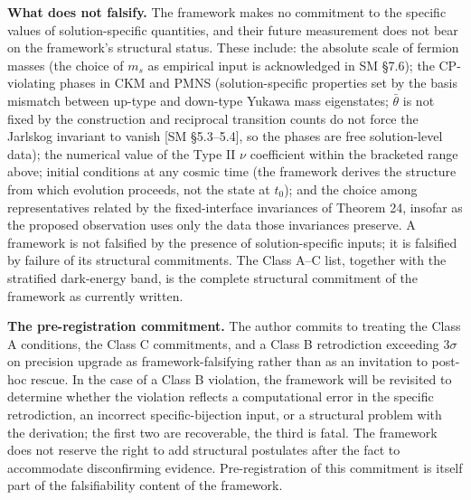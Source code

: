 \documentclass[
]{article}
\begin{document}
\textbf{What does not falsify.} The framework makes no commitment to the
specific values of solution-specific quantities, and their future
measurement does not bear on the framework's structural status. These
include: the absolute scale of fermion masses (the choice of \(m_s\) as
empirical input is acknowledged in SM §7.6); the CP-violating phases in
CKM and PMNS (solution-specific properties set by the basis mismatch
between up-type and down-type Yukawa mass eigenstates; \(\bar\theta\) is
not fixed by the construction and reciprocal transition counts do not
force the Jarlskog invariant to vanish {[}SM §5.3--5.4{]}, so the phases
are free solution-level data); the numerical value of the Type II
\(\nu\) coefficient within the bracketed range above; initial conditions
at any cosmic time (the framework derives the structure from which
evolution proceeds, not the state at \(t_0\)); and the choice among
representatives related by the fixed-interface invariances of Theorem
24, insofar as the proposed observation uses only the data those
invariances preserve. A framework is not falsified by the presence of
solution-specific inputs; it is falsified by failure of its structural
commitments. The Class A--C list, together with the stratified
dark-energy band, is the complete structural commitment of the framework
as currently written.

\textbf{The pre-registration commitment.} The author commits to treating
the Class A conditions, the Class C commitments, and a Class B
retrodiction exceeding \(3\sigma\) on precision upgrade as
framework-falsifying rather than as an invitation to post-hoc rescue. In
the case of a Class B violation, the framework will be revisited to
determine whether the violation reflects a computational error in the
specific retrodiction, an incorrect specific-bijection input, or a
structural problem with the derivation; the first two are recoverable,
the third is fatal. The framework does not reserve the right to add
structural postulates after the fact to accommodate disconfirming
evidence. Pre-registration of this commitment is itself part of the
falsifiability content of the framework.
\end{document}
